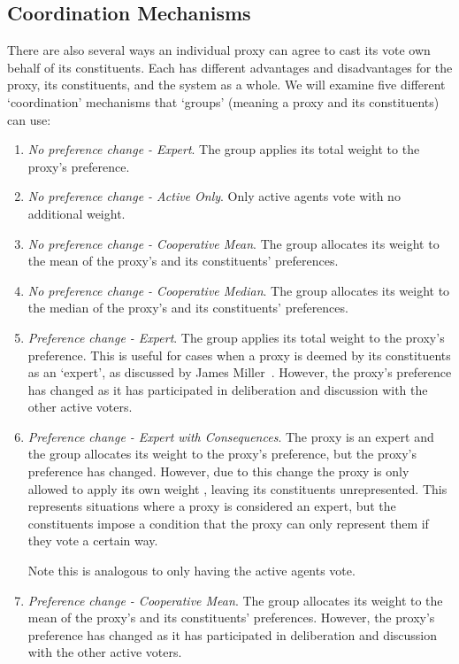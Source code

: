 \subsection{Coordination Mechanisms}
\label{subsec:coordination-mechanisms}
There are also several ways an individual proxy can agree to cast its vote own behalf
of its constituents.
Each has different advantages and disadvantages for the proxy, its constituents, and
the system as a whole.
We will examine five different `coordination' mechanisms that `groups' (meaning a
proxy and its constituents) can use:
\begin{enumerate}
    \item {
        \textit{No preference change - Expert}.
        The group applies its total weight to the proxy's preference.
    }
    \item {
        \textit{No preference change - Active Only}.
        Only active agents vote with no additional weight.
    }
    \item {
        \textit{No preference change - Cooperative Mean}.
        The group allocates its weight to the mean of the proxy's and its
        constituents' preferences.
    }
    \item {
        \textit{No preference change - Cooperative Median}.
        The group allocates its weight to the median of the proxy's and its
        constituents' preferences.
    }
    \item {
        \textit{Preference change - Expert}.
        The group applies its total weight to the proxy's preference.
        This is useful for cases when a proxy is deemed by its constituents as an
        `expert', as discussed by James Miller~\cite{Miller1969}.
        However, the proxy's preference has changed as it has participated in
        deliberation and discussion with the other active voters.
    }
    \item {
        \textit{Preference change - Expert with Consequences}.
        The proxy is an expert and the group allocates its weight to the proxy's
        preference, but the proxy's preference has changed.
        However, due to this change the proxy is only allowed to apply its own
        weight , leaving its constituents unrepresented.
        This represents situations where a proxy is considered an expert, but the
        constituents impose a condition that the proxy can only represent them if
        they vote a certain way.

        Note this is analogous to only having the active agents vote.
    }
    \item {
        \textit{Preference change - Cooperative Mean}.
        The group allocates its weight to the mean of the proxy's and its
        constituents' preferences.
        However, the proxy's preference has changed as it has participated in
        deliberation and discussion with the other active voters.
        
}
\end{enumerate}
